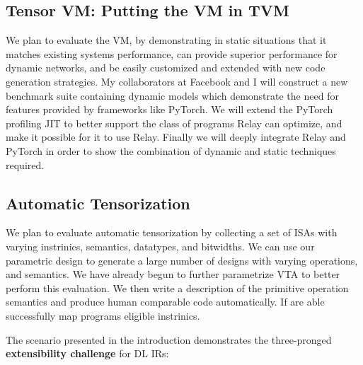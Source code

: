 \subsection{Tensor VM: Putting the VM in TVM}

We plan to evaluate the VM, by demonstrating in
  static situations that it matches existing
  systems performance, can provide superior performance
  for dynamic networks, and be easily customized
  and extended with new code generation strategies.
My collaborators at Facebook and I will construct
  a new benchmark suite containing dynamic models
  which demonstrate the need for features provided by frameworks
  like PyTorch.
We will extend the PyTorch profiling JIT to better support
  the class of programs Relay can optimize, and make it
  possible for it to use Relay.
Finally we will deeply integrate Relay and PyTorch
   in order to show the combination of dynamic and
   static techniques required.

\subsection{Automatic Tensorization}

We plan to evaluate automatic tensorization by collecting
  a set of ISAs with varying instrinics, semantics,
  datatypes, and bitwidths.
We can use our parametric design \vta to generate a large
  number of designs with varying operations, and semantics.
We have already begun to further parametrize VTA to better
  perform this evaluation.
We then write a description of the primitive operation
  semantics and produce human comparable code
  automatically.
If are able successfully map programs eligible instrinics.


The scenario presented in the introduction demonstrates the three-pronged \textbf{extensibility challenge}
  for DL IRs:

